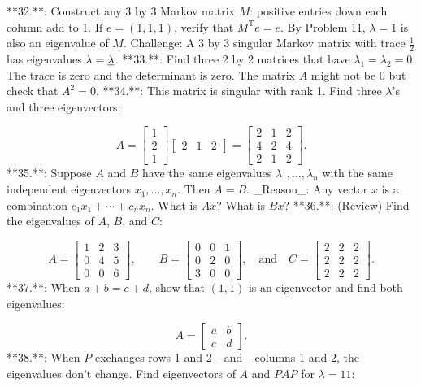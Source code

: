 

**32.**: Construct any 3 by 3 Markov matrix \(M\): positive entries down each column add to 1. If \(e=(1,1,1)\), verify that \(M^{\mathrm{T}}e=e\). By Problem 11, \(\lambda=1\) is also an eigenvalue of \(M\). Challenge: A 3 by 3 singular Markov matrix with trace \(\frac{1}{2}\) has eigenvalues \(\lambda=\underline{\phantom{\rule{0.0pt}{1.0pt}}\lambda}\).
**33.**: Find three 2 by 2 matrices that have \(\lambda_{1}=\lambda_{2}=0\). The trace is zero and the determinant is zero. The matrix \(A\) might not be 0 but check that \(A^{2}=0\).
**34.**: This matrix is singular with rank 1. Find three \(\lambda\)'s and three eigenvectors:

\[A=\begin{bmatrix}1\\ 2\\ 1\end{bmatrix}\begin{bmatrix}2&1&2\end{bmatrix}=\begin{bmatrix}2&1&2\\ 4&2&4\\ 2&1&2\end{bmatrix}.\]
**35.**: Suppose \(A\) and \(B\) have the same eigenvalues \(\lambda_{1},\ldots,\lambda_{n}\) with the same independent eigenvectors \(x_{1},\ldots,x_{n}\). Then \(A=B\). _Reason_: Any vector \(x\) is a combination \(c_{1}x_{1}+\cdots+c_{n}x_{n}\). What is \(Ax\)? What is \(Bx\)?
**36.**: (Review) Find the eigenvalues of \(A\), \(B\), and \(C\):

\[A=\begin{bmatrix}1&2&3\\ 0&4&5\\ 0&0&6\end{bmatrix},\qquad B=\begin{bmatrix}0&0&1\\ 0&2&0\\ 3&0&0\end{bmatrix},\quad\text{and}\quad C=\begin{bmatrix}2&2&2\\ 2&2&2\\ 2&2&2\end{bmatrix}.\]
**37.**: When \(a+b=c+d\), show that \((1,1)\) is an eigenvector and find both eigenvalues:

\[A=\begin{bmatrix}a&b\\ c&d\end{bmatrix}.\]
**38.**: When \(P\) exchanges rows 1 and 2 _and_ columns 1 and 2, the eigenvalues don't change. Find eigenvectors of \(A\) and \(PAP\) for \(\lambda=11\):

